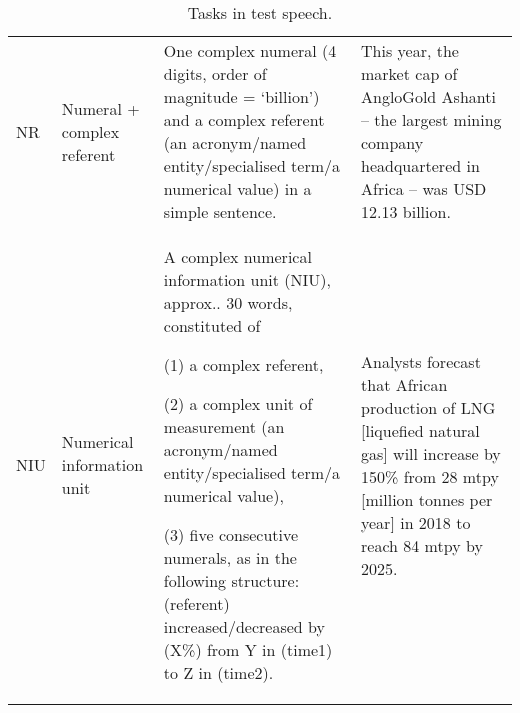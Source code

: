 \begin{sidewaystable}
\begin{tabularx}{\textwidth}{l>{\raggedright\arraybackslash}p{}QQ}
NR                 & Numeral + complex referent                                           & One complex numeral (4 digits, order of magnitude = ‘billion’) and a complex referent (an acronym\slash named entity\slash specialised term\slash a numerical value) in a simple sentence.                                                                                                                                                                                                                                & This year, the market cap of AngloGold Ashanti -- the largest mining company headquartered in Africa -- was USD 12.13 billion.                                                                                                                                                  \\
\tablevspace
NIU                & Numerical information unit                                          & A complex numerical information unit (NIU), approx.. 30 words, constituted of 

(1) a complex referent, 

(2) a   complex unit of measurement (an acronym\slash named entity\slash specialised term\slash a   numerical value), 

(3) five consecutive numerals, as in the following structure: (referent) increased/decreased by (X\%) from Y in (time1) to Z in (time2).                                             & Analysts forecast that African production of LNG {[}liquefied natural gas{]} will increase by 150\%   from 28 mtpy {[}million tonnes per year{]} in 2018 to reach 84 mtpy by 2025.                                                                                           \\ 

\midrule

\end{tabularx}
\caption{Tasks in test speech.}
\label{tab:appendix1}
\end{sidewaystable}


